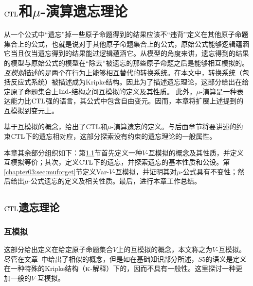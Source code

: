 
\chapter{$\textrm{CTL}$和$\mu$-演算遗忘理论}
\label{chapter03}
{\em 

从一个公式中“遗忘”掉一些原子命题得到的结果应该不“违背”定义在其他原子命题集合上的公式，也就是说对于其他原子命题集合上的公式，原始公式能够逻辑蕴涵它当且仅当遗忘得到的结果能过逻辑蕴涵它。从模型的角度来讲，遗忘得到的结果的模型与原始公式的模型在“除去”被遗忘的那些原子命题之后是能够相互模拟的。\emph{互模拟}描述的是两个在行为上能够相互替代的转换系统\cite{Baier:PMC:2008}。在本文中，转换系统（包括反应式系统）被描述成为Kripke结构。因此为了描述遗忘理论，这部分给出在给定原子命题集合上$\textrm{Ind}$-结构之间互模拟的定义及其性质。
此外，$\mu$-演算是一种表达能力比$\textrm{CTL}$强的语言，其公式中包含自由变元。因而，本章将扩展上述提到的互模拟到变元上。

基于互模拟的概念，给出了$\textrm{CTL}$和$\mu$-演算遗忘的定义。与后面章节将要讲述的约束$\textrm{CTL}$下的遗忘相对应，这部分探索没有约束的遗忘理论的一般属性。

本章其余部分组织如下：第\ref{chapter03:sec:ctlforget}节首先定义一种$V$-互模拟的概念及其性质，并定义互模拟等价；其次，定义$\textrm{CTL}$下的遗忘，并探索遗忘的基本性质和公设。第\ref{chapter03:sec:muforget}节定义Var-$V$-互模拟，并证明其对$\mu$-公式具有不变性；然后给出$\mu$-公式遗忘的定义及相关性质。最后，进行本章工作总结。}

\section{$\textrm{CTL}$遗忘理论}
\label{chapter03:sec:ctlforget}

\subsection{互模拟}
这部分给出定义在给定原子命题集合$V$上的互模拟的概念，本文称之为$V$-互模拟。尽管在文章~\cite{Yan:AIJ:2009}中给出了相似的概念，但是如在基础知识部分所述，$S5$的语义是定义在一种特殊的Kripke结构（$\textsc{k}$-解释）下的，因而不具有一般性。这里探讨一种更加一般的$V$-互模拟。


